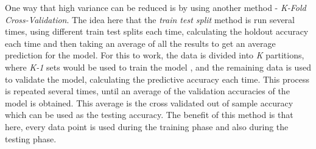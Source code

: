 \documentclass[11pt]{article}
\begin{document}
One way that high variance can be reduced is by using another method - \textit{K-Fold Cross-Validation}. The idea here that the \textit{train test split} method is run several times, using different train test splits each time, calculating the holdout accuracy each time and then taking an average of all the results to get an average prediction for the model. For this to work, the data is divided into \textit{K} partitions, where \textit{K-1} sets would be used to train the model , and the remaining data is used to validate the model, calculating the predictive accuracy each time. This process is repeated several times, until an average of the validation accuracies of the model is obtained. This average is the cross validated out of sample accuracy which can be used as the testing accuracy.  The benefit of this method is that here, every data point is used during the training phase and also during the testing phase.
\end{document}
